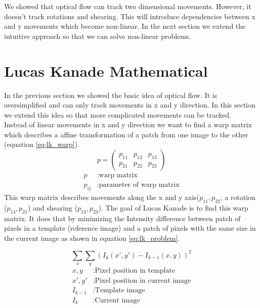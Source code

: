 \documentclass[11pt,a4paper,titlepage,oneside]{report}
\begin{document}
We showed that optical flow can track two dimensional movements. However, it doesn't track rotations and shearing. This will introduce dependencies between x and y movements which become non-linear. In the next section we extend the intuitive approach so that we can solve non-linear problems.

\section{Lucas Kanade Mathematical}

In the previous section we showed the basic idea of optical flow. It is oversimplified and can only track movements in x and y direction. In this section we extend this idea so that more complicated movements can be tracked.\\

Instead of linear movements in x and y direction we want to find a warp matrix which describes a affine transformation of a patch from one image to the other (equation \ref{eq:lk_warp}).
\begin{equation}\label{eq:lk_warp}
	p=\begin{pmatrix}
		p_{11} & p_{12} & p_{13} \\
		p_{21} & p_{22} & p_{23}
	\end{pmatrix}
\end{equation}
\begin{align*}
	p				&:	\text{warp matrix}\\
	p_{ij}	&:	\text{parameter of warp matrix}
\end{align*}
This warp matrix describes movements along the x and y axis($p_{11},p_{22}$, a rotation ($p_{13},p_{21}$) and shearing ($p_{13},p_{23}$). The goal of Lucas Kanade is to find this warp matrix. It does that by minimizing the Intensity difference between patch of pixels in a template (reference image) and a patch of pixels with the same size in the current image as shown in equation \ref{eq:lk_problem}. 

\begin{equation}\label{eq:lk_problem}
	\sum_x\sum_y(I_{k}(x',y')-I_{k-1}(x,y))^2
\end{equation}
\begin{align*}
	x,y				&:	\text{Pixel position in template}\\
	x',y'			&:	\text{Pixel position in current image}\\
	I_{k-1}		&:	\text{Template image}\\
	I_{k}			&:	\text{Current image}
\end{align*}
\end{document}

